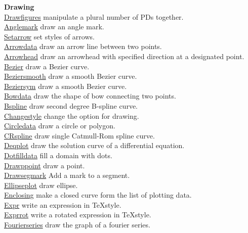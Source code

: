 \documentclass[papersize,a4paper,12pt]{article}
\begin{document}
\begin{tabbing}
{\bf Drawing} \> \\
\hyperlink{drawfigures}{Drawfigures} \> manipulate a plural number of PDs together.\\
\hyperlink{anglemark}{Anglemark} \> draw an angle mark.\\
\hyperlink{setarrow}{Setarrow}  \> set styles of arrows.\\
\hyperlink{arrowdata}{Arrowdata}  \> draw an arrow line between two points.\\
\hyperlink{arrowhead}{Arrowhead}  \>draw an arrowhead with specified direction at a designated point.\\
\hyperlink{bezier}{Bezier} \> draw a  Bezier curve.\\
\hyperlink{beziersmooth}{Beziersmooth} \> draw a smooth Bezier curve.\\\hyperlink{beziersym}{Beziersym}  \> draw a smooth Bezier curve.\\
\hyperlink{bowdata}{Bowdata} \> draw the shape of bow connecting two points.\\
\hyperlink{bspline}{Bspline} \> draw second degree B-spline curve. \\
\hyperlink{changestyle}{Changestyle} \> change the option for drawing. \\
\hyperlink{circledata}{Circledata} \> draw a circle or polygon. \\
\hyperlink{crspline}{CRspline} \> draw single Catmull-Rom spline curve. \\
\hyperlink{deqplot}{Deqplot} \> draw the solution curve of a differential equation.\\
\hyperlink{dotfilldata}{Dotfilldata} \> fill a domain with dots.\\
\hyperlink{drwpt}{Drawppoint} \> draw a point. \\
\hyperlink{drawsegmark}{Drawsegmark} \> Add a mark to a segment. \\
\hyperlink{ellipseplot}{Ellipseplot} \> draw ellipse.\\
\hyperlink{enclosing}{Enclosing} \> make a closed curve form the list of plotting data.\\
\hyperlink{expr}{Expr} \> write an expression in \TeX style.\\
\hyperlink{exprrot}{Exprrot} \> write a rotated expression in \TeX style.\\
\hyperlink{fourierseries}{Fourierseries} \> draw the graph of a fourier series.\\

\end{tabbing}
\end{document}
